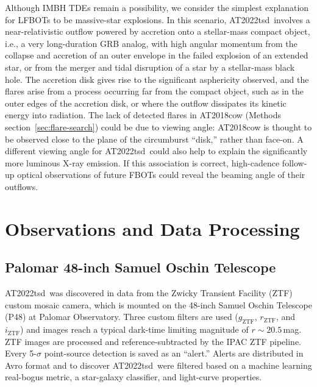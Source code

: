 \documentclass{nature_plusfigure}
\newcommand{\at}{AT2022tsd}
\begin{document}
\begin{methods}
Although IMBH TDEs remain a possibility, we consider the simplest explanation for LFBOTs to be massive-star explosions. In this scenario, \at\ involves a near-relativistic outflow powered by accretion onto a stellar-mass compact object, i.e., a very long-duration GRB analog\cite{Quataert2012}, with high angular momentum from the collapse and accretion of an outer envelope in the failed explosion of an extended star\cite{Perley2021,Metzger2022}, or from the merger and tidal disruption of a star by a stellar-mass black hole\cite{Metzger2022}. The accretion disk gives rise to the significant asphericity observed\cite{Maund2023}, and the flares arise from a process occurring far from the compact object, such as in the outer edges of the accretion disk, or where the outflow dissipates its kinetic energy into radiation. The lack of detected flares in AT2018cow (Methods section~\ref{sec:flare-search}) could be due to viewing angle: AT2018cow is thought to be observed close to the plane of the circumburst ``disk,'' rather than face-on\cite{Margutti2019,Chen2023}. A different viewing angle for \at\ could also help to explain the significantly more luminous X-ray emission.
If this association is correct, high-cadence follow-up optical observations of future FBOTs could reveal the beaming angle of their outflows.

\section{Observations and Data Processing}

\subsection{Palomar 48-inch Samuel Oschin Telescope}
\label{sec:p48}

\at\ was discovered in data from the Zwicky Transient Facility (ZTF) custom mosaic camera\cite{Dekany2020}, which is mounted on the 48-inch Samuel Oschin Telescope (P48) at Palomar Observatory.
Three custom filters are used ($g_{\mathrm{ZTF}}$, $r_{\mathrm{ZTF}}$, and $i_{\mathrm{ZTF}}$\cite{Dekany2020})
and images reach a typical dark-time limiting magnitude of $r\sim20.5\,$mag.
ZTF images are processed and reference-subtracted\cite{Zackay2016}
by the IPAC ZTF pipeline\cite{Masci2019}.
Every 5-$\sigma$ point-source detection is saved as an ``alert.''
Alerts are distributed in Avro format\cite{Patterson2019} and to discover \at\ were filtered based on a machine learning real-bogus metric\cite{Duev2019}, a star-galaxy classifier\cite{Tachibana2018}, and light-curve properties.


\end{methods}
\end{document}

